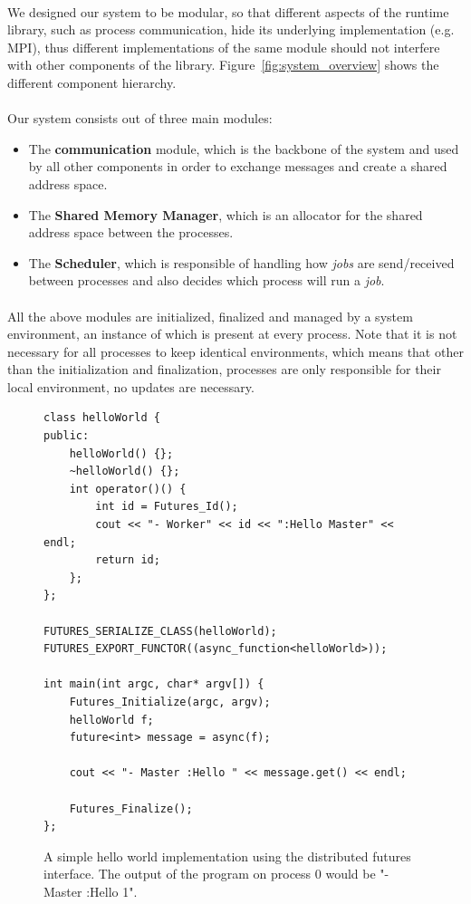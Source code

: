 \paragraph{}
		We designed our system to be modular, so that different aspects of the runtime library, such as process
communication, hide its underlying implementation (e.g. MPI),  thus different implementations 
of the same module should not interfere with other components of the library.
Figure~\ref{fig:system_overview} shows the different component hierarchy.\\
\\
Our system consists out of three main modules:
\begin{itemize}
	\item The \textbf{communication} module, which is the backbone of the system
	and used by all other components in order to exchange messages and create a shared address space.

	\item The \textbf{Shared Memory Manager}, which is an allocator for the shared address space between the processes.

	\item The \textbf{Scheduler}, which is responsible of handling how \emph{jobs} are send/received between processes
	and also decides which process will run a \emph{job}.
\end{itemize}

\paragraph{}
All the above modules are initialized, finalized and managed by a system environment, 
an instance of which is present at every process.  Note that it is not necessary for all
processes to keep identical environments, which means that other than the initialization
and finalization, processes are only responsible for their local environment, no updates
are necessary.

\begin{figure}[!ht]
\begin{lstlisting}
class helloWorld {
public:
	helloWorld() {};
	~helloWorld() {};
	int operator()() { 
		int id = Futures_Id();
		cout << "- Worker" << id << ":Hello Master" << endl;
		return id;
	};
};

FUTURES_SERIALIZE_CLASS(helloWorld);
FUTURES_EXPORT_FUNCTOR((async_function<helloWorld>));

int main(int argc, char* argv[]) {
	Futures_Initialize(argc, argv);
	helloWorld f;
	future<int> message = async(f);

	cout << "- Master :Hello " << message.get() << endl;

	Futures_Finalize();
};
\end{lstlisting}
\caption{
A simple hello world implementation using the distributed futures interface.  
The output of the program on process 0 would be "- Master :Hello 1".}
\label{lst:hello}
\end{figure}

